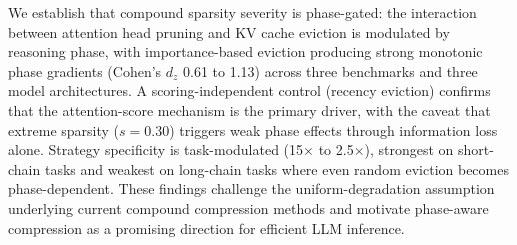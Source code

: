 \documentclass[11pt,a4paper]{article}
\begin{document}
We establish that compound sparsity severity is phase-gated: the interaction between attention head pruning and KV cache eviction is modulated by reasoning phase, with importance-based eviction producing strong monotonic phase gradients (Cohen's $d_z$ 0.61 to 1.13) across three benchmarks and three model architectures. A scoring-independent control (recency eviction) confirms that the attention-score mechanism is the primary driver, with the caveat that extreme sparsity ($s=0.30$) triggers weak phase effects through information loss alone. Strategy specificity is task-modulated (15$\times$ to 2.5$\times$), strongest on short-chain tasks and weakest on long-chain tasks where even random eviction becomes phase-dependent. These findings challenge the uniform-degradation assumption underlying current compound compression methods and motivate phase-aware compression as a promising direction for efficient LLM inference.


\end{document}
